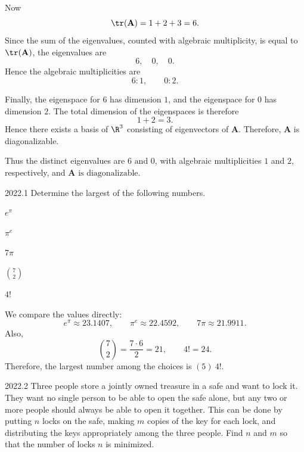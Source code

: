 \begin{solution}
        Now
        \[
            \tr(\mathbf{A})=1+2+3=6.
        \]
        Since the sum of the eigenvalues, counted with algebraic multiplicity, is equal to
        $\tr(\mathbf{A})$, the eigenvalues are
        \[
            6,\quad 0,\quad 0.
        \]
        Hence the algebraic multiplicities are
        \[
            6:1,
            \qquad
            0:2.
        \]

        Finally, the eigenspace for $6$ has dimension $1$, and the eigenspace for $0$ has dimension
        $2$. The total dimension of the eigenspaces is therefore
        \[
            1+2=3.
        \]
        Hence there exists a basis of $\R^3$ consisting of eigenvectors of $\mathbf{A}$. Therefore,
        $\mathbf{A}$ is diagonalizable.

        Thus the distinct eigenvalues are $\boxed{6\text{ and }0}$, with algebraic
        multiplicities $1$ and $2$, respectively, and
        $\boxed{\mathbf{A}\text{ is diagonalizable}}$.
    \end{solution}

    \begin{pastproblem}{2022.1}
        Determine the largest of the following numbers.
        \begin{problemchoices}
            \item \(e^\pi\)
            \item \(\pi^e\)
            \item $7\pi$
            \item \(\binom{7}{2}\)
            \item \(4!\)
        \end{problemchoices}
    \end{pastproblem}

    \begin{solution}
        We compare the values directly:
        \[
            e^\pi \approx 23.1407,
            \qquad
            \pi^e \approx 22.4592,
            \qquad
            7\pi \approx 21.9911.
        \]
        Also,
        \[
            \binom{7}{2}
            =
            \frac{7\cdot 6}{2}
            =
            21,
            \qquad
            4!
            =
            24.
        \]
        Therefore, the largest number among the choices is $\boxed{(5)\ 4!}$.
    \end{solution}

    \begin{pastproblem}{2022.2}
        Three people store a jointly owned treasure in a safe and want to lock it. They want no
        single person to be able to open the safe alone, but any two or more people should always be
        able to open it together. This can be done by putting $n$ locks on the safe, making $m$
        copies of the key for each lock, and distributing the keys appropriately among the three
        people. Find $n$ and $m$ so that the number of locks $n$ is minimized.
    \end{pastproblem}

